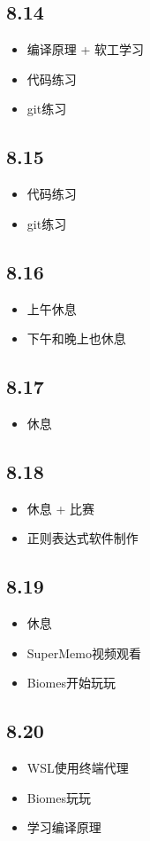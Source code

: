 \documentclass[UTF8]{ctexart}
\begin{document}
\subsection*{8.14}
\begin{itemize}
    \item 编译原理 + 软工学习
    \item 代码练习
    \item git练习
\end{itemize}
\subsection*{8.15}
\begin{itemize}
    \item 代码练习
    \item git练习
\end{itemize}
\subsection*{8.16}
\begin{itemize}
    \item 上午休息
    \item 下午和晚上也休息
\end{itemize}
\subsection*{8.17}
\begin{itemize}
    \item 休息
\end{itemize}
\subsection*{8.18}
\begin{itemize}
    \item 休息 + 比赛
    \item 正则表达式软件制作
\end{itemize}
\subsection*{8.19}
\begin{itemize}
    \item 休息
    \item SuperMemo视频观看
    \item Biomes开始玩玩
\end{itemize}
\subsection*{8.20}
\begin{itemize}
    \item WSL使用终端代理
    \item Biomes玩玩
    \item 学习编译原理
\end{itemize}
\end{document}

